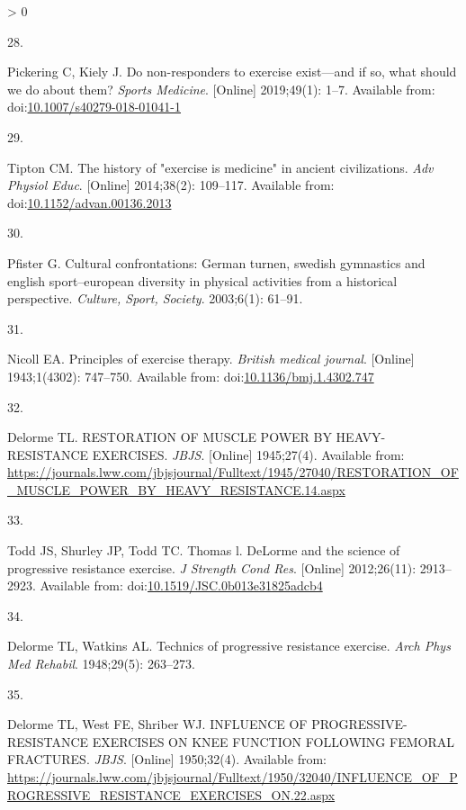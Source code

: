 \documentclass[twoside,10pt]{gihclass} %
\newlength{\cslhangindent}
\newlength{\csllabelwidth}
\newenvironment{CSLReferences}[3] %
 {%
  \setlength{\parindent}{0pt}
  \ifodd #1 \everypar{\setlength{\hangindent}{\cslhangindent}}\ignorespaces\fi
  \ifnum #2 > 0
  \setlength{\parskip}{#2\baselineskip}
  \fi
 }%
 {}
\newcommand{\CSLLeftMargin}[1]{\parbox[t]{\maxof{\widthof{#1}}{\csllabelwidth}}{#1}}
\newcommand{\CSLRightInline}[1]{\parbox[t]{\linewidth}{#1}}
\begin{document}
\begin{CSLReferences}{0}{0}
\leavevmode\hypertarget{ref-RN2547}{}%
\CSLLeftMargin{28. }
\CSLRightInline{Pickering C, Kiely J. Do non-responders to exercise exist---and if so, what should we do about them? \emph{Sports Medicine}. {[}Online{]} 2019;49(1): 1--7. Available from: doi:\href{https://doi.org/10.1007/s40279-018-01041-1}{10.1007/s40279-018-01041-1}}

\leavevmode\hypertarget{ref-RN2640}{}%
\CSLLeftMargin{29. }
\CSLRightInline{Tipton CM. The history of "exercise is medicine" in ancient civilizations. \emph{Adv Physiol Educ}. {[}Online{]} 2014;38(2): 109--117. Available from: doi:\href{https://doi.org/10.1152/advan.00136.2013}{10.1152/advan.00136.2013}}

\leavevmode\hypertarget{ref-RN2663}{}%
\CSLLeftMargin{30. }
\CSLRightInline{Pfister G. Cultural confrontations: German turnen, swedish gymnastics and english sport--european diversity in physical activities from a historical perspective. \emph{Culture, Sport, Society}. 2003;6(1): 61--91. }

\leavevmode\hypertarget{ref-RN2634}{}%
\CSLLeftMargin{31. }
\CSLRightInline{Nicoll EA. Principles of exercise therapy. \emph{British medical journal}. {[}Online{]} 1943;1(4302): 747--750. Available from: doi:\href{https://doi.org/10.1136/bmj.1.4302.747}{10.1136/bmj.1.4302.747}}

\leavevmode\hypertarget{ref-RN2633}{}%
\CSLLeftMargin{32. }
\CSLRightInline{Delorme TL. RESTORATION OF MUSCLE POWER BY HEAVY-RESISTANCE EXERCISES. \emph{JBJS}. {[}Online{]} 1945;27(4). Available from: \url{https://journals.lww.com/jbjsjournal/Fulltext/1945/27040/RESTORATION_OF_MUSCLE_POWER_BY_HEAVY_RESISTANCE.14.aspx}}

\leavevmode\hypertarget{ref-RN2639}{}%
\CSLLeftMargin{33. }
\CSLRightInline{Todd JS, Shurley JP, Todd TC. Thomas l. DeLorme and the science of progressive resistance exercise. \emph{J Strength Cond Res}. {[}Online{]} 2012;26(11): 2913--2923. Available from: doi:\href{https://doi.org/10.1519/JSC.0b013e31825adcb4}{10.1519/JSC.0b013e31825adcb4}}

\leavevmode\hypertarget{ref-RN2641}{}%
\CSLLeftMargin{34. }
\CSLRightInline{Delorme TL, Watkins AL. Technics of progressive resistance exercise. \emph{Arch Phys Med Rehabil}. 1948;29(5): 263--273. }

\leavevmode\hypertarget{ref-RN2646}{}%
\CSLLeftMargin{35. }
\CSLRightInline{Delorme TL, West FE, Shriber WJ. INFLUENCE OF PROGRESSIVE-RESISTANCE EXERCISES ON KNEE FUNCTION FOLLOWING FEMORAL FRACTURES. \emph{JBJS}. {[}Online{]} 1950;32(4). Available from: \url{https://journals.lww.com/jbjsjournal/Fulltext/1950/32040/INFLUENCE_OF_PROGRESSIVE_RESISTANCE_EXERCISES_ON.22.aspx}}


\end{CSLReferences}
\end{document}
